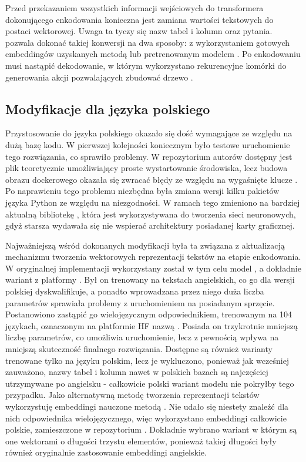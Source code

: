 Przed przekazaniem wszystkich informacji wejściowych do transformera dokonującego enkodowania konieczna jest zamiana wartości tekstowych do postaci wektorowej. Uwaga ta tyczy się nazw tabel i kolumn oraz pytania.  pozwala dokonać takiej konwersji na dwa sposoby: z wykorzystaniem gotowych embeddingów uzyskanych metodą  lub pretrenowanym modelem . Po enkodowaniu musi nastąpić dekodowanie, w którym wykorzystano rekurencyjne komórki  do generowania akcji pozwalających zbudować drzewo .

\subsection{Modyfikacje dla języka polskiego}
Przystosowanie  do języka polskiego okazało się dość wymagające ze względu na dużą bazę kodu. W pierwszej kolejności koniecznym było testowe uruchomienie tego rozwiązania, co sprawiło problemy. W repozytorium autorów dostępny jest plik  teoretycznie umożliwiający proste wystartowanie środowiska, lecz budowa obrazu dockerowego okazała się zwracać błędy ze względu na wygaśnięte klucze . Po naprawieniu tego problemu niezbędna była zmiana wersji kilku pakietów języka Python ze względu na niezgodności. W ramach tego zmieniono na bardziej aktualną bibliotekę , która jest wykorzystywana do tworzenia sieci neuronowych, gdyż starsza wydawała się nie wspierać architektury posiadanej karty graficznej.

Najważniejszą wśród dokonanych modyfikacji była ta związana z aktualizacją mechanizmu tworzenia wektorowych reprezentacji tekstów na etapie enkodowania. W oryginalnej implementacji wykorzystany został w tym celu model , a dokładnie wariant  z platformy . Był on trenowany na tekstach angielskich, co go dla wersji polskiej dyskwalifikuje, a ponadto wprowadzana przez niego duża liczba parametrów sprawiała problemy z uruchomieniem na posiadanym sprzęcie. Postanowiono zastąpić go wielojęzycznym odpowiednikiem, trenowanym na 104 językach, oznaczonym na platformie HF nazwą . Posiada on trzykrotnie mniejszą liczbę parametrów, co umożliwia uruchomienie, lecz z pewnością wpływa na mniejszą skuteczność finalnego rozwiązania. Dostępne są również warianty trenowane tylko na języku polskim, lecz je wykluczono, ponieważ jak wcześniej zauważono, nazwy tabel i kolumn nawet w polskich bazach są najczęściej utrzymywane po angielsku - całkowicie polski wariant modelu  nie pokryłby tego przypadku. Jako alternatywną metodę tworzenia reprezentacji tekstów  wykorzystuję embeddingi nauczone metodą . Nie udało się niestety znaleźć dla nich odpowiednika wielojęzycznego, więc wykorzystano embeddingi całkowicie polskie, zamieszczone w repozytorium . Dokładnie wybrano wariant  w którym są one wektorami o długości trzystu elementów, ponieważ takiej długości były również oryginalnie zastosowanie embeddingi angielskie.

